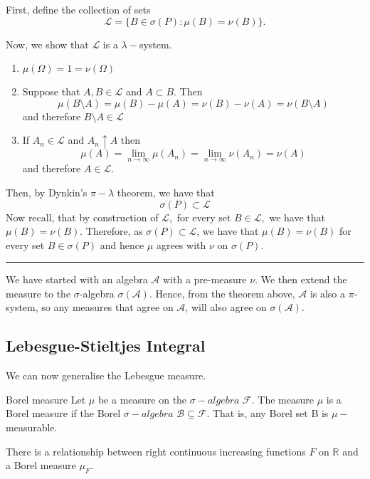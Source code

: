 \documentclass[twoside]{article}
\newenvironment{proof}{{\bf Proof:}}{\hfill\rule{2mm}{2mm}}
\newcommand{\algebra}{\mathcal{A}}
\newcommand{\sigmalgebra}{\mathcal{F}}
\newcommand{\borelsigmaalgebra}{\mathcal{B}}
\newcommand{\sa}{\sigma-algebra}
\begin{document}
\begin{proof} First, define the collection of sets 
$$
\mathcal{L} = \{B \in \sigma(P): \mu(B) = \nu(B)\}.
$$

Now, we show that $\mathcal{L}$ is a $\lambda-$system.

\begin{enumerate}
\item $\mu(\Omega) = 1 = \nu(\Omega)$
\item Suppose that $A, B \in \mathcal{L}$ and $A \subset B.$ Then 
$$
\mu(B \setminus A) = \mu(B) - \mu(A) = \nu(B) - \nu(A) = \nu(B \setminus A)
$$
and therefore $B \setminus A \in \mathcal{L}$
\item If $A_n \in \mathcal{L}$ and $A_n \uparrow A$ then 
$$
\mu(A) = \lim_{n \rightarrow \infty}\mu(A_n) = \lim_{n \rightarrow \infty}\nu(A_n) = \nu(A)
$$
and therefore $A \in \mathcal{L}.$
\end{enumerate}

Then, by Dynkin's $\pi-\lambda$ theorem, we have that 
$$
\sigma(P) \subset \mathcal{L}
$$
Now recall, that by construction of $\mathcal{L},$ for every set $B \in \mathcal{L},$ we have that $\mu(B) = \nu(B).$ Therefore, as $\sigma(P) \subset \mathcal{L}$, we have that $\mu(B) = \nu(B)$ for every set $B \in \sigma(P)$ and hence $\mu$ agrees with $\nu$ on $\sigma(P).$
\end{proof}


We have started with an algebra $\algebra$ with a pre-measure $\nu.$ We then extend the measure to the $\sigma$-algebra $\sigma(\algebra)$. Hence, from the theorem above, $\algebra$ is also a $\pi$-system, so any measures that agree on $\algebra$, will also agree on $\sigma(\algebra).$


\subsection{Lebesgue-Stieltjes Integral}
We can now generalise the Lebesgue measure.

\begin{definition_exam}{Borel measure}{} Let $\mu$ be a measure on the $\sa$ $\sigmalgebra$. The measure $\mu$ is a Borel measure if the Borel $\sa$ $\borelsigmaalgebra \subseteq \sigmalgebra$. That is, any Borel set B is $\mu-$measurable.
\end{definition_exam}

There is a relationship between right continuous increasing functions $F$ on $\mathbb{R}$ and a Borel measure $\mu_F$.
\end{document}
